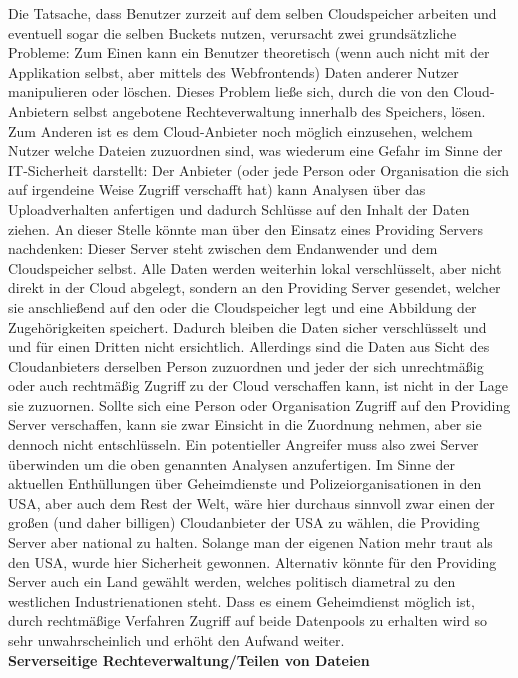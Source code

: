 \documentclass[12pt,a4paper,bibliography=totocnumbered,listof=totocnumbered]{scrartcl}
\begin{document}
Die Tatsache, dass Benutzer zurzeit auf dem selben Cloudspeicher arbeiten und eventuell sogar die selben Buckets nutzen, verursacht zwei grundsätzliche Probleme: Zum Einen kann ein Benutzer theoretisch (wenn auch nicht mit der Applikation selbst, aber mittels des Webfrontends) Daten anderer Nutzer manipulieren oder löschen. Dieses Problem ließe sich, durch die von den Cloud-Anbietern selbst angebotene Rechteverwaltung innerhalb des Speichers, lösen. Zum Anderen ist es dem Cloud-Anbieter noch möglich einzusehen, welchem Nutzer welche Dateien zuzuordnen sind, was wiederum eine Gefahr im Sinne der IT-Sicherheit darstellt: Der Anbieter (oder jede Person oder Organisation die sich auf irgendeine Weise Zugriff verschafft hat) kann Analysen über das Uploadverhalten anfertigen und dadurch Schlüsse auf den Inhalt der Daten ziehen. An dieser Stelle könnte man über den Einsatz eines Providing Servers nachdenken: Dieser Server steht zwischen dem Endanwender und dem Cloudspeicher selbst. Alle Daten werden weiterhin lokal verschlüsselt, aber nicht direkt in der Cloud abgelegt, sondern an den Providing Server gesendet, welcher sie anschließend auf den oder die Cloudspeicher legt und eine Abbildung der Zugehörigkeiten speichert. Dadurch bleiben die Daten sicher verschlüsselt und und für einen Dritten nicht ersichtlich. Allerdings sind die Daten aus Sicht des Cloudanbieters derselben Person zuzuordnen und jeder der sich unrechtmäßig oder auch rechtmäßig Zugriff zu der Cloud verschaffen kann, ist nicht in der Lage sie zuzuornen. Sollte sich eine Person oder Organisation Zugriff auf den Providing Server verschaffen, kann sie zwar Einsicht in die Zuordnung nehmen, aber sie dennoch nicht entschlüsseln. Ein potentieller Angreifer muss also zwei Server überwinden um die oben genannten Analysen anzufertigen. Im Sinne der aktuellen Enthüllungen über Geheimdienste und Polizeiorganisationen in den USA, aber auch dem Rest der Welt, wäre hier durchaus sinnvoll zwar einen der großen (und daher billigen) Cloudanbieter der USA zu wählen, die Providing Server aber national zu halten. Solange man der eigenen Nation mehr traut als den USA, wurde hier Sicherheit gewonnen. Alternativ könnte für den Providing Server auch ein Land gewählt werden, welches politisch diametral zu den westlichen Industrienationen steht. Dass es einem Geheimdienst möglich ist, durch rechtmäßige Verfahren Zugriff auf beide Datenpools zu erhalten wird so sehr unwahrscheinlich und erhöht den Aufwand weiter.
\\\textbf{Serverseitige Rechteverwaltung/Teilen von Dateien}\\
\end{document}
